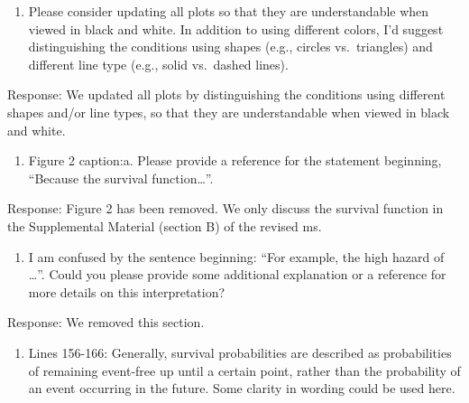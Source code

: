 \documentclass[
]{article}
\providecommand{\tightlist}{%
  \setlength{\itemsep}{0pt}\setlength{\parskip}{0pt}}
\renewenvironment{quote}{\begin{leftbar}}{\end{leftbar}}
\begin{document}
\begin{quote}
\begin{enumerate}
\def\labelenumi{\arabic{enumi}.}
\setcounter{enumi}{2}
\tightlist
\item
  Please consider updating all plots so that they are understandable
  when viewed in black and white. In addition to using different colors,
  I'd suggest distinguishing the conditions using shapes (e.g., circles
  vs.~triangles) and different line type (e.g., solid vs.~dashed lines).
\end{enumerate}
\end{quote}

Response: We updated all plots by distinguishing the conditions using
different shapes and/or line types, so that they are understandable when
viewed in black and white.

\begin{quote}
\begin{enumerate}
\def\labelenumi{\arabic{enumi}.}
\setcounter{enumi}{3}
\tightlist
\item
  Figure 2 caption:a. Please provide a reference for the statement
  beginning, ``Because the survival function\ldots{}''.
\end{enumerate}
\end{quote}

Response: Figure 2 has been removed. We only discuss the survival
function in the Supplemental Material (section B) of the revised ms.

\begin{quote}
\begin{enumerate}
\def\labelenumi{\alph{enumi}.}
\setcounter{enumi}{1}
\tightlist
\item
  I am confused by the sentence beginning: ``For example, the high
  hazard of \ldots{}''. Could you please provide some additional
  explanation or a reference for more details on this interpretation?
\end{enumerate}
\end{quote}

Response: We removed this section.

\begin{quote}
\begin{enumerate}
\def\labelenumi{\arabic{enumi}.}
\setcounter{enumi}{4}
\tightlist
\item
  Lines 156-166: Generally, survival probabilities are described as
  probabilities of remaining event-free up until a certain point, rather
  than the probability of an event occurring in the future. Some clarity
  in wording could be used here.
\end{enumerate}
\end{quote}
\end{document}
